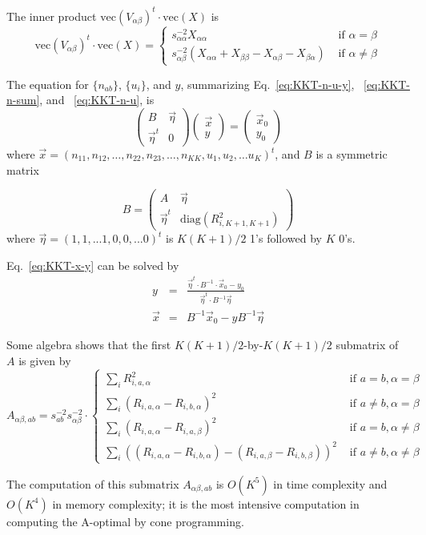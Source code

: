 \documentclass{article}
\newcommand*{\mvec}{\mathbf{\mathrm{vec}}}
\begin{document}
The inner product $\mvec( V_{\alpha\beta})^t \cdot \mvec( X )$ is
\begin{equation}
\mvec( V_{\alpha\beta})^t \cdot \mvec( X ) = \left\{
\begin{array}{cl}
s_{\alpha\alpha}^{-2} X_{\alpha\alpha}   & \text{ if } \alpha = \beta \\
s_{\alpha\beta}^{-2} \left(X_{\alpha\alpha} + X_{\beta\beta} - X_{\alpha\beta} - X_{\beta\alpha}\right) & \text{ if } \alpha \neq \beta
\end{array} \right.
\end{equation}

The equation for $\{n_{ab}\}$, $\{u_i\}$, and $y$, summarizing Eq.~\ref{eq:KKT-n-u-y}, ~\ref{eq:KKT-n-sum}, and ~\ref{eq:KKT-n-u}, is
\begin{equation}
\left(
\begin{array}{cc}
B & \vec{\eta} \\
\vec{\eta}^t & 0 
\end{array}\right)
\left(
\begin{array}{c}
\vec{x} \\
y 
\end{array} \right) = \left(
\begin{array}{c}
\vec{x}_0 \\
y_0 
\end{array}
\right)
\label{eq:KKT-x-y}
\end{equation}
where $\vec{x} = (n_{11}, n_{12}, \dots, n_{22}, n_{23}, \dots, n_{KK}, u_1, u_2,  
\dots u_K)^t$, and $B$ is a symmetric matrix

\begin{equation}
B = \left(
\begin{array}{cc}
A & \vec{\eta} \\
\vec{\eta}^t & \mathrm{diag}( R_{i,K+1,K+1}^2)
\end{array}
\right)
\end{equation}
where $\vec{\eta} = ( 1, 1, ... 1, 0, 0, ... 0 )^t$ is $K(K+1)/2$ 1's
followed by $K$ 0's.

Eq.~\ref{eq:KKT-x-y} can be solved by 
\begin{eqnarray}
y &=& \frac{\vec{\eta}^t\cdot B^{-1}\cdot\vec{x}_0 - y_0}{\vec{\eta}^t\cdot B^{-1} \vec{\eta}} \nonumber \\
\vec{x} &=& B^{-1}\vec{x}_0 - y B^{-1}\vec{\eta}
\end{eqnarray}

Some algebra shows that the first $K(K+1)/2$-by-$K(K+1)/2$ submatrix of $A$ is given by
\begin{equation}
A_{\alpha\beta,ab} = 
s_{ab}^{-2}s_{\alpha\beta}^{-2} \cdot \left\{
\begin{array}{cl}
\sum_i R_{i,a,\alpha}^2 & \text{ if } a=b, \alpha=\beta \\
\sum_i (R_{i,a,\alpha} - R_{i,b,\alpha})^2 & \text{ if } a\neq b, \alpha=\beta \\
\sum_i (R_{i,a,\alpha} - R_{i,a,\beta})^2 & \text{ if } a=b, \alpha\neq\beta \\
\sum_i ((R_{i,a,\alpha} - R_{i,b,\alpha}) - (R_{i,a,\beta} - R_{i,b,\beta}))^2 & \text{ if } a\neq b, \alpha\neq\beta
\end{array}\right.
\end{equation}

The computation of this submatrix $A_{\alpha\beta,ab}$ is $O(K^5)$ in
time complexity and $O(K^4)$ in memory complexity; it is the most
intensive computation in computing the A-optimal by cone programming.
\end{document}
